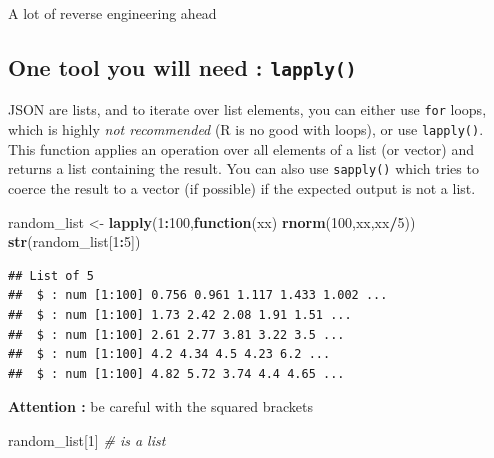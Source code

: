 \documentclass[
]{book}
\newenvironment{Shaded}{\begin{snugshade}}{\end{snugshade}}
\newcommand{\CommentTok}[1]{\textcolor[rgb]{0.56,0.35,0.01}{\textit{#1}}}
\newcommand{\ControlFlowTok}[1]{\textcolor[rgb]{0.13,0.29,0.53}{\textbf{#1}}}
\newcommand{\DecValTok}[1]{\textcolor[rgb]{0.00,0.00,0.81}{#1}}
\newcommand{\KeywordTok}[1]{\textcolor[rgb]{0.13,0.29,0.53}{\textbf{#1}}}
\newcommand{\NormalTok}[1]{#1}
\newcommand{\OperatorTok}[1]{\textcolor[rgb]{0.81,0.36,0.00}{\textbf{#1}}}
\newcommand{\StringTok}[1]{\textcolor[rgb]{0.31,0.60,0.02}{#1}}
\begin{document}
A lot of reverse engineering ahead

\hypertarget{one-tool-you-will-need-lapply}{%
\subsection{\texorpdfstring{One tool you will need : \texttt{lapply()}}{One tool you will need : lapply()}}\label{one-tool-you-will-need-lapply}}

JSON are lists, and to iterate over list elements, you can either use \texttt{for} loops, which is highly \emph{not recommended} (R is no good with loops), or use \texttt{lapply()}. This function applies an operation over all elements of a list (or vector) and returns a list containing the result. You can also use \texttt{sapply()} which tries to coerce the result to a vector (if possible) if the expected output is not a list.

\begin{Shaded}
\begin{Highlighting}[]
\NormalTok{random_list <-}\StringTok{ }\KeywordTok{lapply}\NormalTok{(}\DecValTok{1}\OperatorTok{:}\DecValTok{100}\NormalTok{,}\ControlFlowTok{function}\NormalTok{(xx) }\KeywordTok{rnorm}\NormalTok{(}\DecValTok{100}\NormalTok{,xx,xx}\OperatorTok{/}\DecValTok{5}\NormalTok{))}
\KeywordTok{str}\NormalTok{(random_list[}\DecValTok{1}\OperatorTok{:}\DecValTok{5}\NormalTok{])}
\end{Highlighting}
\end{Shaded}

\begin{verbatim}
## List of 5
##  $ : num [1:100] 0.756 0.961 1.117 1.433 1.002 ...
##  $ : num [1:100] 1.73 2.42 2.08 1.91 1.51 ...
##  $ : num [1:100] 2.61 2.77 3.81 3.22 3.5 ...
##  $ : num [1:100] 4.2 4.34 4.5 4.23 6.2 ...
##  $ : num [1:100] 4.82 5.72 3.74 4.4 4.65 ...
\end{verbatim}

\textbf{Attention :} be careful with the squared brackets

\begin{Shaded}
\begin{Highlighting}[]
\NormalTok{random_list[}\DecValTok{1}\NormalTok{] }\CommentTok{# is a list}
\end{Highlighting}
\end{Shaded}
\end{document}
